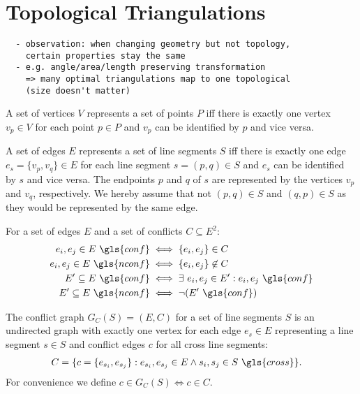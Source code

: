\section{Topological Triangulations}

\begin{verbatim}
  - observation: when changing geometry but not topology,
    certain properties stay the same
  - e.g. angle/area/length preserving transformation
    => many optimal triangulations map to one topological
    (size doesn't matter)
\end{verbatim}

\begin{definition}
  A set of vertices \(V\) represents a set of points \(P\) iff there
  is exactly one vertex \(v_p \in V\) for each point \(p \in P\) and
  \(v_p\) can be identified by \(p\) and vice versa.
  
  A set of edges \(E\) represents a set of line segments \(S\) iff
  there is exactly one edge \(e_s = \{v_p, v_q\} \in E\) for each line 
  segment \(s = (p,q) \in S\) and \(e_s\) can be identified by \(s\) 
  and vice versa. The endpoints \(p\) and \(q\) of \(s\) are 
  represented by the vertices \(v_p\) and \(v_q\), respectively. We
  hereby assume that not \((p,q) \in S\) and \((q,p) \in S\) as they
  would be represented by the same edge.
\end{definition}


\begin{definition}\label{def:conflicting}
  For a set of edges \(E\) and a set of conflicts \(C \subseteq E^2\):
  \begin{alignat*}{1}
    e_i, e_j \in E~\gls{conf} &\iff \{e_i, e_j\} \in C \\
    e_i, e_j \in E~\gls{nconf} &\iff \{e_i, e_j\} \not\in C \\
    E' \subseteq E~\gls{conf} &\iff \exists~e_i, e_j \in E' : e_i, e_j~\gls{conf} \\
    E' \subseteq E~\gls{nconf} &\iff \lnot(E'~\gls{conf})
  \end{alignat*}
\end{definition}


\begin{definition}\label{def:conflict_graph}
  The conflict graph \(G_C(S) = (E,C)\) for a set of line segments
  \(S\) is an undirected graph with exactly one vertex for each edge
  \(e_s \in E\) representing a line segment \(s \in S\) and conflict
  edges \(c\) for all \gls{cross} line segments:
  \begin{alignat*}{1}
    C &= \{
      c = \{e_{s_i}, e_{s_j}\} : 
      e_{s_i}, e_{s_j} \in E
      \land s_i, s_j \in S~\gls{cross}
    \}.
  \end{alignat*}
  For convenience we define \(c \in G_C(S) \iff c \in C\).
\end{definition}

